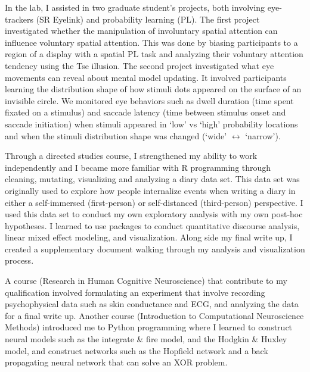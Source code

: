 \documentclass[12pt]{article}
\begin{document}
	In the lab, I assisted in two graduate student's projects, both involving eye-trackers (SR Eyelink) and probability learning (PL). The first project investigated whether the manipulation of involuntary spatial attention can influence voluntary spatial attention. This was done by biasing participants to a region of a display with a spatial PL task and analyzing their voluntary attention tendency using the Tse illusion. The second project investigated what eye movements can reveal about mental model updating. It involved participants learning the distribution shape of how stimuli dots appeared on the surface of an invisible circle. We monitored eye behaviors such as dwell duration (time spent fixated on a stimulus) and saccade latency (time between stimulus onset and saccade initiation) when stimuli appeared in `low' vs `high' probability locations and when the stimuli distribution shape was changed (`wide' $\leftrightarrow$ `narrow').
	
	Through a directed studies course, I strengthened my ability to work independently and I became more familiar with R programming through cleaning, mutating, visualizing and analyzing a diary data set. This data set was originally used to explore how people internalize events when writing a diary in either a self-immersed (first-person) or self-distanced (third-person) perspective. I used this data set to conduct my own exploratory analysis with my own post-hoc hypotheses. I learned to use packages to conduct quantitative discourse analysis, linear mixed effect modeling, and visualization. Along side my final write up, I created a supplementary document walking through my analysis and visualization process.
	
	A course (Research in Human Cognitive Neuroscience) that contribute to my qualification involved formulating an experiment that involve recording psychophysical data such as skin conductance and ECG, and analyzing the data for a final write up. Another course (Introduction to Computational Neuroscience Methods) introduced me to Python programming where I learned to construct neural models such as the integrate \& fire model, and the Hodgkin \& Huxley model, and construct networks such as the Hopfield network and a back propagating neural network that can solve an XOR problem.
	
\end{document}
